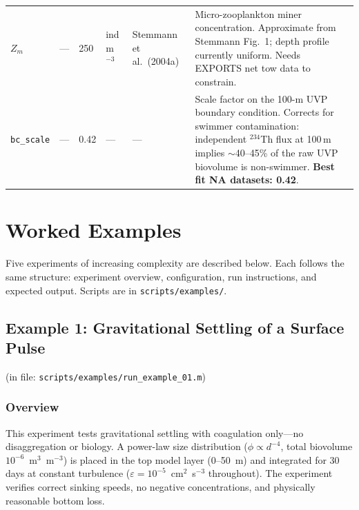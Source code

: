 \documentclass[12pt,a4paper]{report}
\numberwithin{equation}{chapter}
\begin{document}
\begin{landscape}
\begin{longtable}{p{1.5cm} p{2.5cm} p{2.0cm} p{2.0cm} p{2.5cm} p{9.5cm}}
$Z_m$ & --- & 250 & ind\,m$^{-3}$ &
Stemmann et al.\ (2004a) &
Micro-zooplankton miner concentration. Approximate from Stemmann Fig.~1; depth profile currently uniform. Needs EXPORTS net tow data to constrain. \\[3pt]

\texttt{bc\_scale} & --- & 0.42 & --- &
--- &
Scale factor on the 100-m UVP boundary condition. Corrects for swimmer contamination: independent $^{234}$Th flux at 100\,m implies $\sim$40--45\% of the raw UVP biovolume is non-swimmer. \textbf{Best fit NA datasets: 0.42}. \\[3pt]

\end{longtable}
\end{landscape}

\chapter{Worked Examples}

Five experiments of increasing complexity are described below.
Each follows the same structure: experiment overview, configuration,
run instructions, and expected output. Scripts are in
\texttt{scripts/examples/}.

\section{Example 1: Gravitational Settling of a Surface Pulse}
\label{sec:ex01}
(in file: \texttt{scripts/examples/run\_example\_01.m})

\subsection{Overview}

This experiment tests gravitational settling with coagulation only---no
disaggregation or biology. A power-law size distribution ($\phi \propto d^{-4}$,
total biovolume $10^{-6}$~m$^3$~m$^{-3}$) is placed in the top model layer
(0--50~m) and integrated for 30 days at constant turbulence
($\varepsilon = 10^{-5}$~cm$^2$~s$^{-3}$ throughout). The experiment
verifies correct sinking speeds, no negative concentrations, and
physically reasonable bottom loss.
\end{document}
